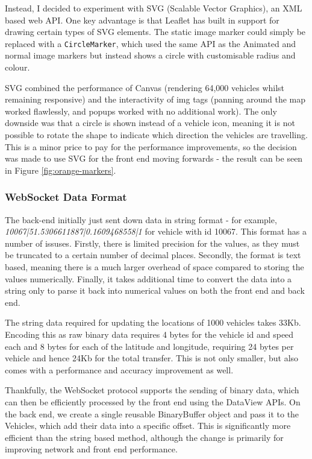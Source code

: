 \documentclass[ %
                    author={Alexander Hill},
                supervisor={Dr. Benjamin Sach},
                    degree={MEng},
                     title={MARMOSET},
                  subtitle={Multi-Agent Route Management using Online Simulation for Efficient Transportation},
                      type={research},
                      year={2016} ]{dissertation}
\begin{document}
Instead, I decided to experiment with SVG (Scalable Vector Graphics), an XML
based web API. One key advantage is that Leaflet has built in support for
drawing certain types of SVG elements. The static image marker could simply be
replaced with a \texttt{CircleMarker}, which used the same API as the Animated
and normal image markers but instead shows a circle with customisable radius and
colour.

SVG combined the performance of Canvas (rendering 64,000 vehicles whilst
remaining responsive) and the interactivity of img tags (panning around the map
worked flawlessly, and popups worked with no additional work). The only downside
was that a circle is shown instead of a vehicle icon, meaning it is not possible
to rotate the shape to indicate which direction the vehicles are travelling.
This is a minor price to pay for the performance improvements, so the decision
was made to use SVG for the front end moving forwards - the result can be seen
in Figure \ref{fig:orange-markers}.

\subsubsection{WebSocket Data Format}

The back-end initially just sent down data in string format - for example,
\textit{10067|51.5306611887|0.1609468558|1} for vehicle with id 10067. This
format has a number of issuses. Firstly, there is limited precision for the
values, as they must be truncated to a certain number of decimal places.
Secondly, the format is text based, meaning there is a much larger overhead of
space compared to storing the values numerically. Finally, it takes additional
time to convert the data into a string only to parse it back into numerical
values on both the front end and back end.

The string data required for updating the locations of 1000 vehicles takes 33Kb.
Encoding this as raw binary data requires 4 bytes for the vehicle id and speed
each and 8 bytes for each of the latitude and longitude, requiring 24 bytes per
vehicle and hence 24Kb for the total transfer.  This is not only smaller, but
also comes with a performance and accuracy improvement as well.

Thankfully, the WebSocket protocol supports the sending of binary data, which
can then be efficiently processed by the front end using the DataView APIs. On
the back end, we create a single reusable BinaryBuffer object and pass it to the
Vehicles, which add their data into a specific offset. This is significantly
more efficient than the string based method, although the change is primarily
for improving network and front end performance.
\end{document}
